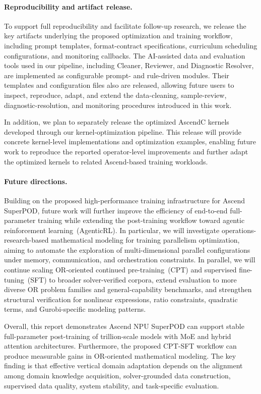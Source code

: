 \paragraph{Reproducibility and artifact release.}
To support full reproducibility and facilitate follow-up research, we  release the key artifacts underlying the proposed optimization and training workflow, including prompt templates, format-contract specifications, curriculum scheduling configurations, and monitoring callbacks. The AI-assisted data and evaluation tools used in our pipeline, including Cleaner, Reviewer, and Diagnostic Resolver, are implemented as configurable prompt- and rule-driven modules. Their templates and configuration files also are released, allowing future users to inspect, reproduce, adapt, and extend the data-cleaning, sample-review, diagnostic-resolution, and monitoring procedures introduced in this work.

In addition, we plan to separately release the optimized AscendC kernels developed through our kernel-optimization pipeline. This release will provide concrete kernel-level implementations and optimization examples, enabling future work to reproduce the reported operator-level improvements and further adapt the optimized kernels to related Ascend-based training workloads.

\paragraph{Future directions.}
Building on the proposed high-performance training infrastructure for Ascend SuperPOD, future work will further improve the efficiency of end-to-end full-parameter training while extending the post-training workflow toward agentic reinforcement learning~(AgenticRL). In particular, we will investigate operations-research-based mathematical modeling for training parallelism optimization, aiming to automate the exploration of multi-dimensional parallel configurations under memory, communication, and orchestration constraints. In parallel, we will continue scaling OR-oriented continued pre-training~(CPT) and supervised fine-tuning~(SFT) to broader solver-verified corpora, extend evaluation to more diverse OR problem families and general-capability benchmarks, and strengthen structural verification for nonlinear expressions, ratio constraints, quadratic terms, and Gurobi-specific modeling patterns.

Overall, this report demonstrates Ascend NPU SuperPOD can
support stable full-parameter post-training of trillion-scale models with MoE and hybrid attention architectures. 
Furthermore, the proposed CPT-SFT workflow can produce measurable gains in
OR-oriented mathematical modeling. The key finding is that effective vertical
domain adaptation depends on the alignment among domain knowledge acquisition,
solver-grounded data construction, supervised data quality, system stability,
and task-specific evaluation.

